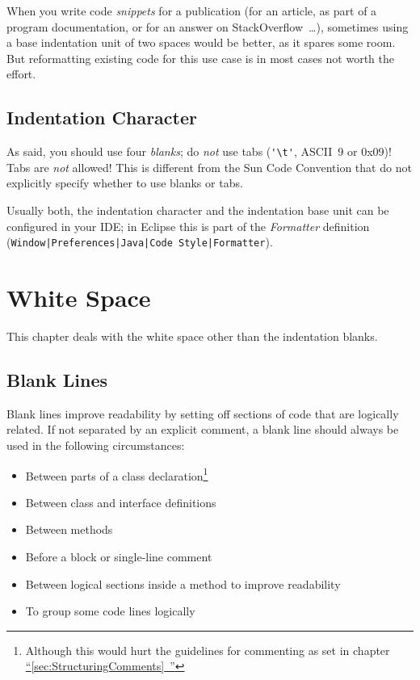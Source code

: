 \documentclass[11pt,a4paper, titlepage, parskip=half, headsepline, footsepline, cleardoublepage=current, headheight=1cm]{scrbook}
\newcommand*{\tqfullref}[1]{\hyperref[{#1}]{“\ref*{#1}~\nameref*{#1}”}}
\begin{document}
When you write code \textit{snippets} for a publication (for an article, as part of a program documentation, or for an answer on StackOverflow\autocite{STACKOVERFLOW}~…), sometimes using a base indentation unit of two spaces would be better, as it spares some room. But reformatting existing code for this use case is in most cases not worth the effort.

\subsection{Indentation Character}\label{sec:IndentationCharacter}
As said, you should use four \textit{blanks}; do \textit{not} use tabs (\lstinline|'\t'|, ASCII~9 or 0x09)! Tabs are \textit{not} allowed! This is different from the Sun Code Convention\autocite{SUN_CODE_CONVENTIONS:Indentation} that do not explicitly specify whether to use blanks or tabs.

Usually both, the indentation character and the indentation base unit can be configured in your IDE; in Eclipse this is part of the \textit{Formatter} definition (\verb#Window|Preferences|Java|Code Style|Formatter#).


\section{White Space}
This chapter deals with the white space other than the indentation blanks.

\subsection{Blank Lines}\label{sec:BlankLines}
Blank lines improve readability by setting off sections of code that are logically related.
If not separated by an explicit comment, a blank line should always be used in the following circumstances:
\begin{itemize}
\item{Between parts of a class declaration\footnote{Although this would hurt the guidelines for commenting as set in chapter \tqfullref{sec:StructuringComments}}}
\item{Between class and interface definitions}
\item{Between methods}
\item{Before a block or single-line comment}
\item{Between logical sections inside a method to improve readability}
\item{To group some code lines logically}
\end{itemize}
\end{document}
